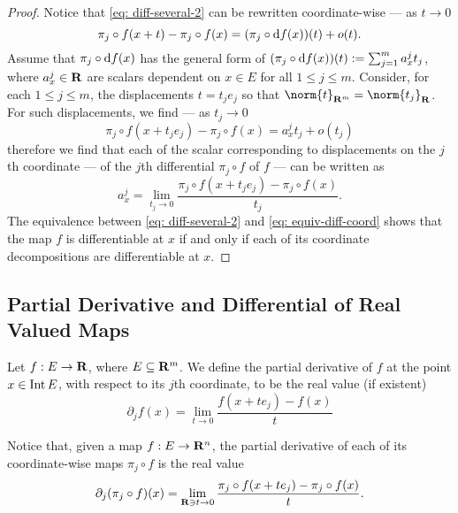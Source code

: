 \begin{proof}
  Notice that \cref{eq: diff-several-2} can be rewritten coordinate-wise --- as
  \(t \to 0\)
  \begin{equation}\label{eq: equiv-diff-coord}
    \pi_j \circ f(x + t) - \pi_j \circ f(x)
    = (\pi_j \circ \mathrm{d} f(x))(t) + o(t).
  \end{equation}
  Assume that \(\pi_j \circ \mathrm{d} f(x)\) has the general form of \((\pi_j \circ
  \mathrm{d} f(x))(t) := \sum_{j=1}^m a_x^j t_j\), where \(a_x^j \in \mathbf{R}\) are scalars
  dependent on \(x \in E\) for all \(1 \leq j \leq m\). Consider, for each \(1
  \leq j \leq m\), the displacements \(t = t_j e_j\) so that \(\norm{t}_{\R^m} =
  \norm{t_j}_{\R}\). For such displacements, we find --- as \(t_j \to 0\)
  \[
    \pi_j \circ f(x + t_j e_j) - \pi_j \circ f(x) = a_x^j t_j + o(t_j)
  \]
  therefore we find that each of the scalar corresponding to displacements on
  the \(j\)th coordinate --- of the \(j\)th differential \(\pi_j \circ f\) of
  \(f\) --- can be written as
  \begin{equation}\label{eq: partial-deriv-initial}
    a_x^j = \lim_{t_j \to 0} \frac{\pi_j \circ f(x + t_j e_j) - \pi_j \circ
    f(x)} {t_j}.
  \end{equation}
  The equivalence between \cref{eq: diff-several-2} and \cref{eq:
  equiv-diff-coord} shows that the map \(f\) is differentiable at \(x\) if and
  only if each of its coordinate decompositions are differentiable at \(x\).
\end{proof}

\subsection{Partial Derivative and Differential of Real Valued Maps}

\begin{definition}\label{def: partial derivative}
  Let \(f: E \to \mathbf{R}\), where \(E \subseteq \mathbf{R}^m\). We define the partial
  derivative of \(f\) at the point \(x \in \operatorname{Int} E\), with respect to its \(j\)th
  coordinate, to be the real value (if existent)
  \[
    \partial_j f(x) = \lim_{t \to 0} \frac{f(x + t e_j) - f(x)}{t}
  \]
\end{definition}

Notice that, given a map \(f: E \to \mathbf{R}^n\), the partial derivative of each of
its coordinate-wise maps \(\pi_j \circ f\) is the real value
\[
  \partial_j (\pi_j \circ f)(x) = \lim_{\mathbf{R} \ni t \to 0} \frac{\pi_j \circ f(x
  + t e_j) - \pi_j \circ f(x)}{t}.
\]

